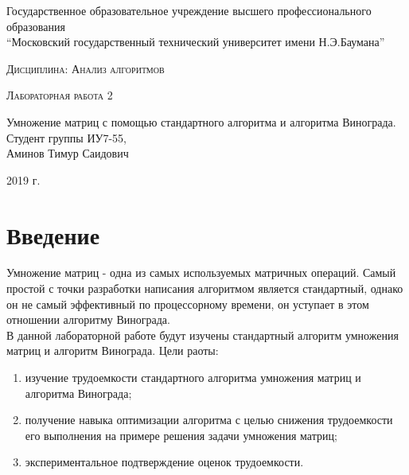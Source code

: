 \documentclass[a4paper, 14pt]{article}
\begin{document}
    \begin{titlepage}

        \begin{center}
            \large
            Государственное образовательное учреждение высшего профессионального образования\\
            “Московский государственный технический университет имени Н.Э.Баумана”
            \vspace{3cm}
            
            \textsc{Дисциплина: Анализ алгоритмов}
            \vspace{0.5cm}
                
            \textsc{Лабораторная работа 2}
            \vspace{1.5cm}
            
            {\LARGE Умножение матриц с помощью стандартного алгоритма и алгоритма Винограда.\\}
            \vspace{1.5cm}
            Студент группы ИУ7-55,\\   
            Аминов Тимур Саидович
            \vfill
            
            2019 г.
            
            \end{center}

    \end{titlepage}
    \setcounter{page}{2}
\tableofcontents
	
	\newpage
	
        \section*{Введение}
        
        
        \parindent=1cm
        Умножение матриц - одна из самых используемых матричных операций. Самый простой с точки разработки написания алгоритмом является стандартный, однако он не самый  эффективный по процессорному времени, он уступает в этом отношении алгоритму Винограда.\\
		В данной лабораторной работе будут изучены стандартный алгоритм умножения матриц и алгоритм Винограда.
        Цели раоты:
		\begin{enumerate}[label=\arabic*)]
		\item изучение трудоемкости стандартного алгоритма умножения матриц и алгоритма Винограда;
		\item получение навыка оптимизации алгоритма с целью снижения трудоемкости его выполнения на примере решения задачи умножения матриц;
		\item экспериментальное подтверждение оценок трудоемкости.
		\end{enumerate}
        
\end{document}
